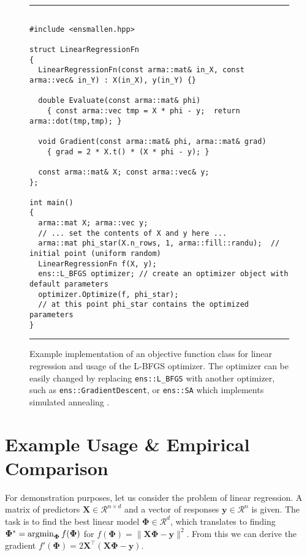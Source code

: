 \documentclass[twoside,11pt]{article}
\begin{document}
\begin{figure}[b!]
\hrule
\vspace{1ex}
\centering
\begin{verbatim}

#include <ensmallen.hpp>

struct LinearRegressionFn
{
  LinearRegressionFn(const arma::mat& in_X, const arma::vec& in_Y) : X(in_X), y(in_Y) {}

  double Evaluate(const arma::mat& phi)
    { const arma::vec tmp = X * phi - y;  return arma::dot(tmp,tmp); }
  
  void Gradient(const arma::mat& phi, arma::mat& grad)
    { grad = 2 * X.t() * (X * phi - y); }

  const arma::mat& X; const arma::vec& y;
};

int main() 
{
  arma::mat X; arma::vec y;
  // ... set the contents of X and y here ...
  arma::mat phi_star(X.n_rows, 1, arma::fill::randu);  // initial point (uniform random)
  LinearRegressionFn f(X, y);
  ens::L_BFGS optimizer; // create an optimizer object with default parameters
  optimizer.Optimize(f, phi_star);
  // at this point phi_star contains the optimized parameters
}
\end{verbatim}
\hrule
\vspace*{-0.5em}
\caption{Example implementation of an objective function class for linear
regression and usage of the L-BFGS optimizer.
The optimizer can be easily changed by replacing
{\tt ens::L\_BFGS} with another optimizer,
such as {\tt ens::GradientDescent},
or {\tt ens::SA} which implements simulated annealing \citep{kirkpatrick1983optimization}.
}
\label{fig:lr_function}
\vspace*{-2em}
\end{figure}


\section{Example Usage \& Empirical Comparison}

For demonstration purposes, let us consider the problem of linear regression.
A matrix of predictors $\bm X \in \mathcal{R}^{n \times d}$
and a vector of responses $\bm y \in \mathcal{R}^n$ is given.
The task is to find the best linear model $\bm \Phi \in \mathcal{R}^d$,
which translates to finding
$\bm \Phi^* = \operatornamewithlimits{argmin}_{\bm\Phi} f(\bm \Phi)$ for
$f(\bm \Phi) = \| \bm X \bm \Phi - \bm y \|^2.$
From this we can derive the gradient
$f'(\bm \Phi) = 2 \bm X^{\top} (\bm X \bm \Phi - \bm y).$
\end{document}
